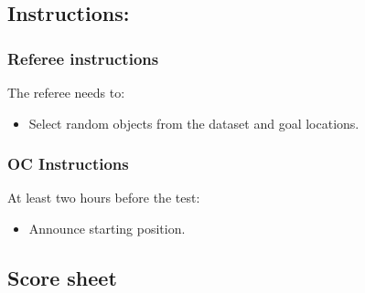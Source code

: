 \subsection*{Instructions:}
\subsubsection*{Referee instructions}

The referee needs to:
\begin{itemize}[nosep]
	\item Select random objects from the dataset and goal locations.
\end{itemize}

\subsubsection*{OC Instructions}
At least two hours before the test:
\begin{itemize}[nosep]
	\item Announce starting position.
\end{itemize}

\subsection*{Score sheet}

